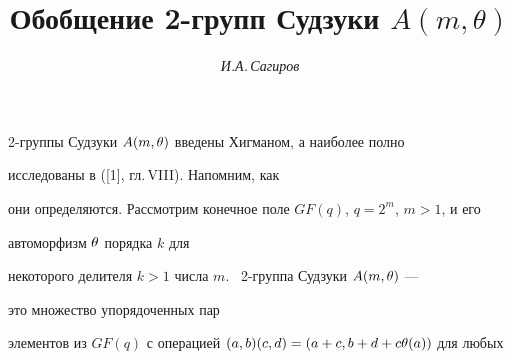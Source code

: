 \renewcommand{\thecornonum}{}







\setcounter{page}{56}















\author{\it И.А.\,Сагиров}




\title{Обобщение 2-групп Судзуки $A(m,\theta)$}





\date{}




\pagestyle{plain} %







\maketitle


\label{begin}











2-группы Судзуки $A(m,\theta)$ введены Хигманом, а наиболее полно


исследованы в ([1], гл.\,VIII). Напомним, как


они определяются. Рассмотрим конечное поле $GF(q)$, $q=2^m$, $m>1$, и его


автоморфизм $\theta$ порядка $k$ для 


некоторого делителя $k>1$ числа $m$. \ 2-группа Судзуки $A(m,\theta)$ --- 


это множество упорядоченных пар


элементов из $GF(q)$ с операцией $(a,b)(c,d)=(a+c,b+d+c\theta(a))$ для любых


